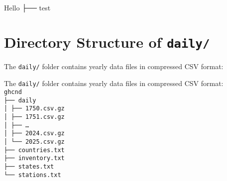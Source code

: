 \documentclass{article}
\begin{document}
Hello ├── test
\section*{Directory Structure of \texttt{daily/}}

The \texttt{daily/} folder contains yearly data files in compressed CSV format:

\bigskip
\noindent The \texttt{daily/} folder contains yearly data files in compressed CSV format:
\texttt{%
\\
ghcnd\\
├── daily\\
│   ├── 1750.csv.gz\\
│   ├── 1751.csv.gz\\
│   ├── \ldots\\
│   ├── 2024.csv.gz\\
│   └── 2025.csv.gz\\
├── countries.txt\\
├── inventory.txt\\
├── states.txt\\
└── stations.txt
}
\end{document}
